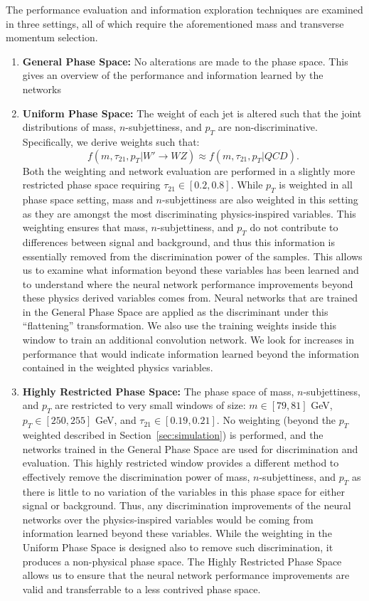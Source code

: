 \noindent The performance evaluation and information exploration techniques are examined in three settings, all of which require the aforementioned mass and transverse momentum selection.
\begin{enumerate}

\item \textbf{General Phase Space:} No alterations are made to the phase space.  This gives an overview of the performance and information learned by the networks

\item  \textbf{Uniform Phase Space:}  The weight of each jet is altered such that the joint distributions of mass, $n$-subjettiness, and $p_T$ are non-discriminative.  Specifically, we derive weights such that:
\begin{equation}
  f(m, \tau_{21}, p_T| W'\rightarrow WZ) \approx f(m, \tau_{21}, p_T| QCD).
\end{equation}
Both the weighting and network evaluation are performed in a slightly more restricted phase space requiring $\tau_{21}\in [0.2, 0.8]$. While $p_T$ is weighted in all phase space setting, mass and $n$-subjettiness are also weighted in this setting as they are amongst the most discriminating physics-inspired variables.  This weighting ensures that mass, $n$-subjettiness, and $p_T$ do not contribute to differences between signal and background, and thus this information is essentially removed from the discrimination power of the samples.  This allows us to examine what information beyond these variables has been learned and to understand where the neural network performance improvements beyond these physics derived variables comes from.  Neural networks that are trained in the General Phase Space are applied as the discriminant under this ``flattening'' transformation. We also use the training weights inside this window to train an additional convolution network. We look for increases in performance that would indicate information learned beyond the information contained in the weighted physics variables.

\item \textbf{Highly Restricted Phase Space:} The phase space of mass, $n$-subjettiness, and $p_T$ are restricted to very small windows of size: $m\in [79, 81]$ GeV,  $p_T \in [250, 255]$ GeV, and  $\tau_{21} \in [0.19, 0.21]$. No weighting (beyond the $p_{T}$ weighted described in Section~\ref{sec:simulation}) is performed, and the networks trained in the General Phase Space are used for discrimination and evaluation.  This highly restricted window provides a different method to effectively remove the discrimination power of mass, $n$-subjettiness, and $p_T$ as there is little to no variation of the variables in this phase space for either signal or background.  Thus, any discrimination improvements of the neural networks over the physics-inspired variables would be coming from information learned beyond these variables.  While the weighting in the Uniform  Phase Space is designed also to remove such discrimination, it produces a non-physical phase space.  The Highly Restricted Phase Space allows us to ensure that the neural network performance improvements are valid and transferrable to a less contrived phase space.


\end{enumerate}
